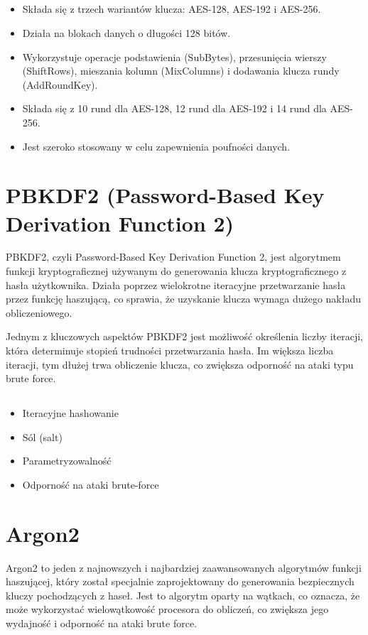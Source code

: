 \documentclass{article}
\begin{document}
\begin{enumerate}
\subsection*{}
    \begin{itemize}
        \item Składa się z trzech wariantów klucza: AES-128, AES-192 i AES-256.
        \item Działa na blokach danych o długości 128 bitów.
        \item Wykorzystuje operacje podstawienia (SubBytes), przesunięcia wierszy (ShiftRows), mieszania kolumn (MixColumns) i dodawania klucza rundy (AddRoundKey).
        \item Składa się z 10 rund dla AES-128, 12 rund dla AES-192 i 14 rund dla AES-256.
        \item Jest szeroko stosowany w celu zapewnienia poufności danych.
    \end{itemize}   

\section*{PBKDF2 (Password-Based Key Derivation Function 2)} 
    PBKDF2, czyli Password-Based Key Derivation Function 2, jest algorytmem funkcji kryptograficznej używanym do generowania klucza kryptograficznego z hasła użytkownika. Działa poprzez wielokrotne iteracyjne przetwarzanie hasła przez funkcję haszującą, co sprawia, że uzyskanie klucza wymaga dużego nakładu obliczeniowego.

    Jednym z kluczowych aspektów PBKDF2 jest możliwość określenia liczby iteracji, która determinuje stopień trudności przetwarzania hasła. Im większa liczba iteracji, tym dłużej trwa obliczenie klucza, co zwiększa odporność na ataki typu brute force. 

\subsection*{}
    \begin{itemize}
        \item Iteracyjne hashowanie
        \item Sól (salt)
        \item Parametryzowalność
        \item Odporność na ataki brute-force
    \end{itemize}
    
\section*{Argon2} 
    Argon2 to jeden z najnowszych i najbardziej zaawansowanych algorytmów funkcji haszującej, który został specjalnie zaprojektowany do generowania bezpiecznych kluczy pochodzących z haseł. Jest to algorytm oparty na wątkach, co oznacza, że może wykorzystać wielowątkowość procesora do obliczeń, co zwiększa jego wydajność i odporność na ataki brute force. 
    

\end{enumerate}
\end{document}
